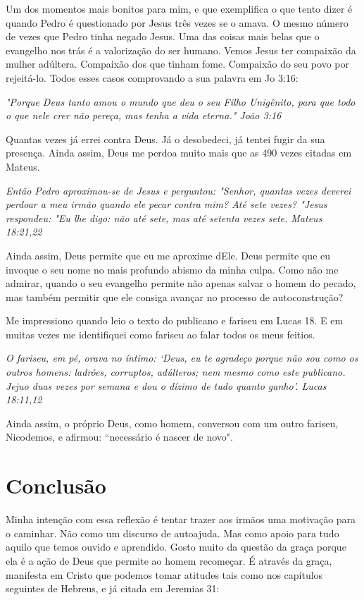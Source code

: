 \documentclass[12pt, legalpaper]{article}
\begin{document}
Um dos momentos mais bonitos para mim, e que exemplifica o que tento dizer é quando Pedro é questionado por Jesus três vezes se o amava. O mesmo número de vezes que Pedro tinha negado Jesus.
Uma das coisas mais belas que o evangelho nos trás é a valorização do ser humano. Vemos Jesus ter compaixão da mulher adúltera. Compaixão dos que tinham fome. Compaixão do seu povo por rejeitá-lo. Todos esses casos comprovando a sua palavra em Jo 3:16:

\emph{"Porque Deus tanto amou o mundo que deu o seu Filho Unigênito, para que todo o que nele crer não pereça, mas tenha a vida eterna." João 3:16}


Quantas vezes já errei contra Deus. Já o desobedeci, já tentei fugir da sua presença. Ainda assim, Deus me perdoa muito mais que as 490 vezes citadas em Mateus. 

\emph{Então Pedro aproximou-se de Jesus e perguntou: "Senhor, quantas vezes deverei perdoar a meu irmão quando ele pecar contra mim? Até sete vezes? "Jesus respondeu: "Eu lhe digo: não até sete, mas até setenta vezes sete. Mateus 18:21,22}

\newpage

Ainda assim, Deus permite que eu me aproxime dEle. Deus permite que eu invoque o seu nome no mais profundo abismo da minha culpa. Como não me admirar, quando o seu evangelho permite não apenas salvar o homem do pecado, mas também permitir que ele consiga avançar no processo de autoconstrução? 

Me impressiono quando leio o texto do publicano e fariseu em Lucas 18. E em muitas vezes me identifiquei como fariseu ao falar todos os meus feitios. 

\emph{O fariseu, em pé, orava no íntimo: ‘Deus, eu te agradeço porque não sou como os outros homens: ladrões, corruptos, adúlteros; nem mesmo como este publicano. Jejuo duas vezes por semana e dou o dízimo de tudo quanto ganho’. Lucas 18:11,12}

Ainda assim, o próprio Deus, como homem, conversou com um outro fariseu, Nicodemos, e afirmou: ``necessário é nascer de novo".

\section{Conclusão}
Minha intenção com essa reflexão é tentar trazer aos irmãos uma motivação para o caminhar. Não como um discurso de autoajuda. Mas como apoio para tudo aquilo que temos ouvido e aprendido. Gosto muito da questão da graça porque ela é a ação de Deus que permite ao homem recomeçar. É através da graça, manifesta em Cristo que podemos tomar atitudes tais como nos capítulos seguintes de Hebreus, e já citada em Jeremias 31:
\end{document}
